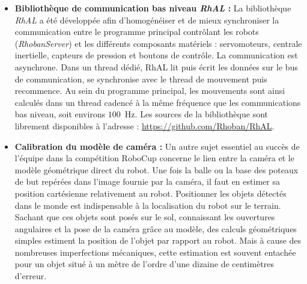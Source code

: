 \begin{itemize}
        À noter que cette expérimentation à eut lieu en 2014. 
        Étant donné que la mécanique, l'électronique et le logiciel
        (par exemple la marche\footnote{Le mouvement de marche utilisé en 2014 était basé 
        sur le générateur \textit{CartWalk}. Partageant les mêmes principes que 
        la marche \textit{IKWalk}, ce générateur était qualitativement moins stable 
        et moins paramétrable.}) ont depuis beaucoup évolué, il pourrait être intéressant 
        de retenter cette étude.
        Une vidéo du dispositif expérimental est disponible à l'adresse : 
        \url{https://youtu.be/xxazn_JJaWs}\\.
    \item \textbf{Bibliothèque de communication bas niveau \textit{RhAL} : }
        La bibliothèque \textit{RhAL} a été développée afin d'homogénéiser et
        de mieux synchroniser la communication entre le programme principal contrôlant 
        les robots (\textit{RhobanServer}) et les différents composants matériels :
        servomoteurs, centrale inertielle, capteurs de pression et boutons de contrôle.
        La communication est asynchrone. Dans un thread dédié, RhAL lit puis écrit
        les données sur le bus de communication, se synchronise avec le 
        thread de mouvement puis recommence. 
        Au sein du programme principal, les mouvements sont ainsi calculés dans un
        thread cadencé à la même fréquence que les communications bas niveau, 
        soit environs $100$~Hz.
        Les sources de la bibliothèque sont librement disponibles à l'adresse :
        \url{https://github.com/Rhoban/RhAL}.\\
    \item \textbf{Calibration du modèle de caméra : }
        Un autre sujet essentiel au succès de l'équipe dans la compétition RoboCup 
        concerne le lien entre la caméra et le modèle géométrique direct du robot.
        Une fois la balle ou la base des poteaux de but repérées dans l'image
        fournie par la caméra, il faut en estimer sa position cartésienne 
        relativement au robot.
        Positionner les objets détectés dans le monde est indispensable 
        à la localisation du robot sur le terrain.
        Sachant que ces objets sont posés sur le sol, connaissant les ouvertures
        angulaires et la pose de la caméra grâce au modèle, des calculs géométriques 
        simples estiment la position de l'objet par rapport au robot.
        Mais à cause des nombreuses imperfections mécaniques, cette estimation
        est souvent entachée pour un objet situé à un mètre de l'ordre d'une dizaine
        de centimètres d'erreur.
        

\end{itemize}
